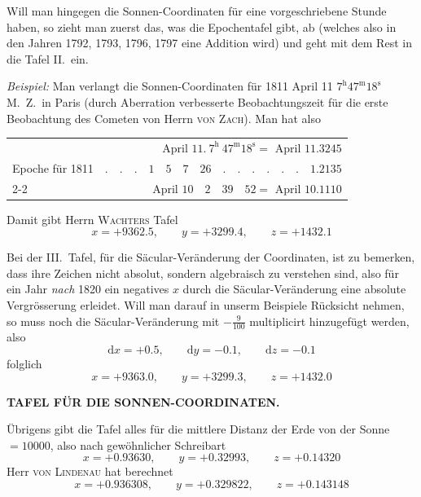 Will man hingegen die Sonnen-Coordinaten für eine vorgeschriebene Stunde haben, so zieht man zuerst das, was die Epochentafel gibt, ab (welches also in den Jahren 1792, 1793, 1796, 1797 eine Addition wird) und geht mit dem Rest in die Tafel II.\ ein.

\emph{Beispiel:} Man verlangt die Sonnen-Coordinaten für 1811 April 11 $7^{\mathrm h}47^{\mathrm m}18^{\mathrm s}$ M.\ Z.\ in Paris (durch Aberration verbesserte Beobachtungszeit für die erste Beobachtung des Cometen von Herrn \textsc{von Zach}). Man hat also
\begin{center}
\begin{tabular}{lr}
& April $11.\ 7^{\mathrm h}\ 47^{\mathrm m}18^{\mathrm s}=$ April $11.3245$\\
Epoche für 1811 & $.\quad.\quad.\quad1\quad5\quad7\quad26\quad.\quad.\quad.\quad.\quad.\quad.\quad1.2135$\\\cline{2-2}
& April $10\quad2\quad39\quad52=$ April $10.1110$
\end{tabular}
\end{center}
Damit gibt Herrn \textsc{Wachters} Tafel
\[
x=+9362.5,\qquad y=+3299.4,\qquad z=+1432.1
\]

Bei der III.\ Tafel, für die Säcular-Veränderung der Coordinaten, ist zu bemerken, dass ihre Zeichen nicht absolut, sondern algebraisch zu verstehen sind, also für ein Jahr \emph{nach} 1820 ein negatives $x$ durch die Säcular-Veränderung eine absolute Vergrösserung erleidet. Will man darauf in unserm Beispiele Rücksicht nehmen, so muss noch die Säcular-Veränderung mit $-\frac9{100}$ multiplicirt hinzugefügt werden, also
\[
\mathrm dx=+0.5,\qquad\mathrm dy=-0.1,\qquad\mathrm dz=-0.1
\]
folglich
\[
x=+9363.0,\qquad y=+3299.3,\qquad z=+1432.0
\]
\clearpage
\thispagestyle{empty}
\noindent{}%
\makebox[12mm][l]{}%
\parbox[t]{\dimexpr\linewidth-24mm\relax}{\centering\footnotesize\bfseries TAFEL FÜR DIE SONNEN-COORDINATEN.\par}%
\par\nobreak\medskip
\par\indent Übrigens gibt die Tafel alles für die mittlere Distanz der Erde von der Sonne $=10000$, also nach gewöhnlicher Schreibart
\[
x=+0.93630,\qquad y=+0.32993,\qquad z=+0.14320
\]
Herr \textsc{von Lindenau} hat berechnet
\[
x=+0.936308,\qquad y=+0.329822,\qquad z=+0.143148
\]

